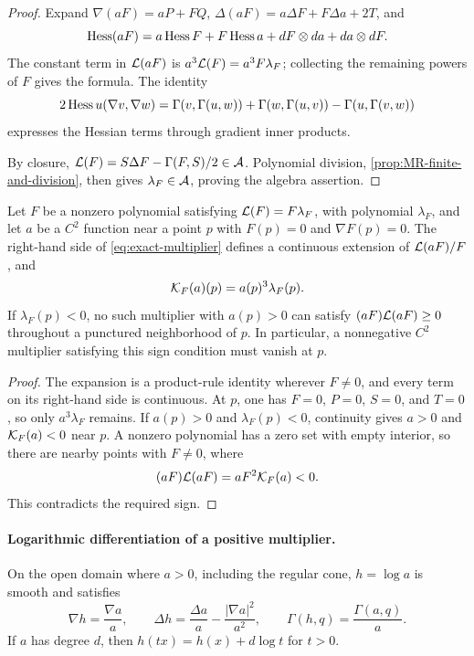 \begin{proof}
Expand \(\nabla(aF)=aP+FQ\),
\(\Delta(aF)=a\Delta F+F\Delta a+2T\), and
\[
 \operatorname{Hess}(aF)=a\operatorname{Hess} F+F\operatorname{Hess} a+dF\otimes da+da\otimes dF.
\]
The constant term in \(\mathcal L(aF)\) is
\(a^3\mathcal L(F)=a^3F\lambda_F\); collecting the remaining powers of \(F\)
gives the formula.  The identity
\[
 2\operatorname{Hess} u(\nabla v,\nabla w)
 =\Gamma(v,\Gamma(u,w))+\Gamma(w,\Gamma(u,v))
  -\Gamma(u,\Gamma(v,w))
\]
expresses the Hessian terms through gradient inner products.

By closure, \(\mathcal L(F)=S\Delta F-\Gamma(F,S)/2\in\mathcal A\).
Polynomial division, \cref{prop:MR-finite-and-division}, then gives
\(\lambda_F\in\mathcal A\), proving the algebra assertion.
\end{proof}

\begin{lemma}
\label{lem:critical-multiplier-defect}
Let \(F\) be a nonzero polynomial satisfying
\(\mathcal L(F)=F\lambda_F\), with polynomial \(\lambda_F\), and let
\(a\) be a \(C^2\) function near a point \(p\) with
\(F(p)=0\) and \(\nabla F(p)=0\).
The right-hand side of \eqref{eq:exact-multiplier} defines a continuous
extension of \(\mathcal L(aF)/F\), and
\begin{equation}\label{eq:critical-multiplier-defect}
 \mathcal K_F(a)(p)=a(p)^3\lambda_F(p).
\end{equation}
If \(\lambda_F(p)<0\), no such multiplier with \(a(p)>0\)
can satisfy \((aF)\mathcal L(aF)\ge0\) throughout a punctured neighborhood
of \(p\). In particular, a nonnegative \(C^2\) multiplier satisfying
this sign condition must vanish at \(p\).
\end{lemma}

\begin{proof}
The expansion is a product-rule identity wherever \(F\ne0\), and
every term on its right-hand side is continuous. At \(p\), one has
\(F=0\), \(P=0\), \(S=0\), and \(T=0\), so only
\(a^3\lambda_F\) remains. If \(a(p)>0\) and
\(\lambda_F(p)<0\), continuity gives \(a>0\) and
\(\mathcal K_F(a)<0\) near \(p\). A nonzero polynomial has a zero set
with empty interior, so there are nearby points with \(F\ne0\), where
\[
 (aF)\mathcal L(aF)=aF^2\mathcal K_F(a)<0.
\]
This contradicts the required sign.
\end{proof}

\paragraph{Logarithmic differentiation of a positive multiplier.}
On the open domain where \(a>0\), including the regular cone,
\(h=\log a\) is smooth and satisfies
\begin{equation}\label{eq:log-multiplier-derivatives}
 \nabla h=\frac{\nabla a}{a},\qquad
 \Delta h=\frac{\Delta a}{a}-\frac{|\nabla a|^2}{a^2},\qquad
 \Gamma(h,q)=\frac{\Gamma(a,q)}a.
\end{equation}
If $a$ has degree $d$, then $h(tx)=h(x)+d\log t$ for $t>0$.

